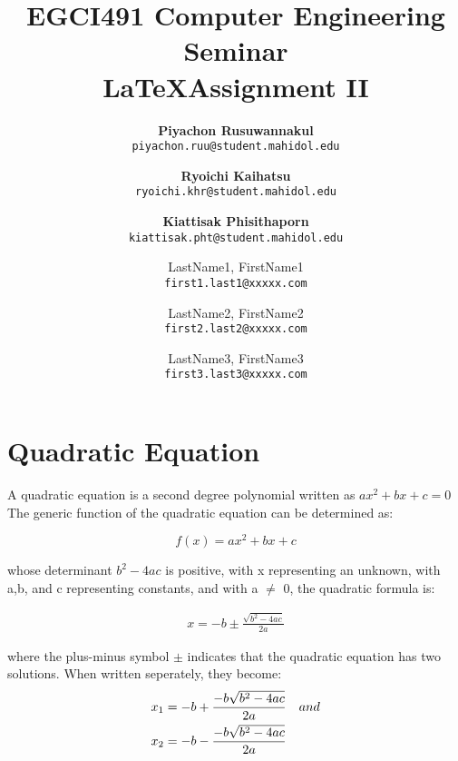 \documentclass[a4paper]{article} %
\title{EGCI491 Computer Engineering Seminar\\ \LaTeX Assignment II}
\author{
	\textbf{Piyachon Rusuwannakul} \\
	\texttt{piyachon.ruu@student.mahidol.edu}
	\and
	\textbf{Ryoichi Kaihatsu} \\
	\texttt{ryoichi.khr@student.mahidol.edu}
	\and
	\textbf{Kiattisak Phisithaporn} \\
	\texttt{kiattisak.pht@student.mahidol.edu}
}
\author{
		LastName1, FirstName1\\
		\texttt{first1.last1@xxxxx.com} 
		
		
		\and
		LastName2, FirstName2\\
		\texttt{first2.last2@xxxxx.com}
		\and
		LastName3, FirstName3\\
		\texttt{first3.last3@xxxxx.com}

	}
\begin{document}
	\maketitle
	\section{\textbf{Quadratic Equation}}
	A quadratic equation is a second degree polynomial written as $ax^2 + bx + c = 0$
	The generic function of the quadratic equation can be determined as:
	\begin{center}
		\begin{equation}
			f(x) = ax^2 + bx + c
		\end{equation}
		\end{center}
	whose determinant $b^2 - 4ac$ is positive, with x representing an unknown, with a,b, and c representing constants, and with a $\neq$ 0, the quadratic formula is:
	\begin{center}
		\begin{align}
			x = -b \pm \frac{  \sqrt{b^2 - 4ac}}{2a}
			\end{align}
		\end{center}
	where the plus-minus symbol $\pm$ indicates that the quadratic equation has two solutions. When written seperately, they become:
	\begin{align}
		\begin{split}
			x_1 &= -b +  \frac{-b  \sqrt{b^2 - 4ac}}{2a} \hspace*{10pt} and\\
			x_2 &= -b - \frac{-b  \sqrt{b^2 - 4ac}}{2a}
			\end{split}
		\end{align}
\end{document}

